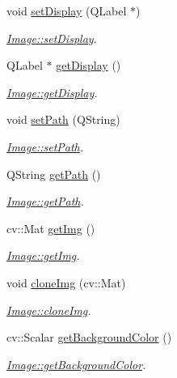 \begin{DoxyCompactItemize}
void \mbox{\hyperlink{class_image_a2bdf1bb13666021cb46e0a886bba25f4}{set\+Display}} (Q\+Label $\ast$)
\begin{DoxyCompactList}\small\item\em \mbox{\hyperlink{class_image_a2bdf1bb13666021cb46e0a886bba25f4}{Image\+::set\+Display}}. \end{DoxyCompactList}\item 
Q\+Label $\ast$ \mbox{\hyperlink{class_image_a6d62147aced3396b08f0be7db6987732}{get\+Display}} ()
\begin{DoxyCompactList}\small\item\em \mbox{\hyperlink{class_image_a6d62147aced3396b08f0be7db6987732}{Image\+::get\+Display}}. \end{DoxyCompactList}\item 
void \mbox{\hyperlink{class_image_a00270889235de4a75a620c94e7b56682}{set\+Path}} (Q\+String)
\begin{DoxyCompactList}\small\item\em \mbox{\hyperlink{class_image_a00270889235de4a75a620c94e7b56682}{Image\+::set\+Path}}. \end{DoxyCompactList}\item 
Q\+String \mbox{\hyperlink{class_image_a7bf2bf3762aedf13b9a2fe924c2adb67}{get\+Path}} ()
\begin{DoxyCompactList}\small\item\em \mbox{\hyperlink{class_image_a7bf2bf3762aedf13b9a2fe924c2adb67}{Image\+::get\+Path}}. \end{DoxyCompactList}\item 
cv\+::\+Mat \mbox{\hyperlink{class_image_ad55c64e3ec01d2fb5f5568eff58abaf2}{get\+Img}} ()
\begin{DoxyCompactList}\small\item\em \mbox{\hyperlink{class_image_ad55c64e3ec01d2fb5f5568eff58abaf2}{Image\+::get\+Img}}. \end{DoxyCompactList}\item 
void \mbox{\hyperlink{class_image_a5ed60b8ab5bece73fd951c3a23071c04}{clone\+Img}} (cv\+::\+Mat)
\begin{DoxyCompactList}\small\item\em \mbox{\hyperlink{class_image_a5ed60b8ab5bece73fd951c3a23071c04}{Image\+::clone\+Img}}. \end{DoxyCompactList}\item 
cv\+::\+Scalar \mbox{\hyperlink{class_image_ad27c80fa2dedc38a385b69fc587e80b1}{get\+Background\+Color}} ()
\begin{DoxyCompactList}\small\item\em \mbox{\hyperlink{class_image_ad27c80fa2dedc38a385b69fc587e80b1}{Image\+::get\+Background\+Color}}. \end{DoxyCompactList}\item 

\end{DoxyCompactItemize}
